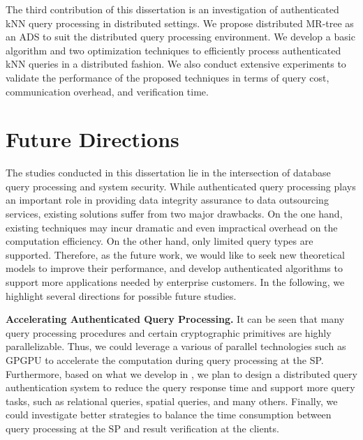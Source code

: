 The third contribution of this dissertation is an investigation of authenticated kNN query processing in distributed settings. We propose distributed MR-tree as an ADS to suit the distributed query processing environment. We develop a basic algorithm and two optimization techniques to efficiently process authenticated kNN queries in a distributed fashion. We also conduct extensive experiments to validate the performance of the proposed techniques in terms of query cost, communication overhead, and verification time.

\section{Future Directions}

The studies conducted in this dissertation lie in the intersection of database query processing and system security. While authenticated query processing plays an important role in providing data integrity assurance to data outsourcing services, existing solutions suffer from two major drawbacks. On the one hand, existing techniques may incur dramatic and even impractical overhead on the computation efficiency. On the other hand, only limited query types are supported. Therefore, as the future work, we would like to seek new theoretical models to improve their performance, and develop authenticated algorithms to support more applications needed by enterprise customers. In the following, we highlight several directions for possible future studies.

\textbf{Accelerating Authenticated Query Processing.}
It can be seen that many query processing procedures and certain cryptographic primitives are highly parallelizable. Thus, we could leverage a various of parallel technologies such as GPGPU to accelerate the computation during query processing at the SP\@. Furthermore, based on what we develop in , we plan to design a distributed query authentication system to reduce the query response time and support more query tasks, such as relational queries, spatial queries, and many others. Finally, we could investigate better strategies to balance the time consumption between query processing at the SP and result verification at the clients.

